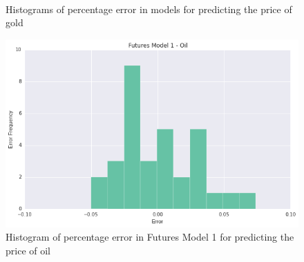 \documentclass[runningheads]{llncs}
\begin{document}
\begin{figure}
\\
\caption{Histograms of percentage error in models for predicting the price of gold}
\label{fig:GoldErrorHistogram.png}
\end{figure}

\begin{figure}
\centering
\includegraphics[width=\textwidth]{futures_oil1.png}
\caption{Histogram of percentage error in Futures Model 1 for predicting the price of oil}
\label{fig:futures_oil1.png}
\end{figure}
\end{document}
